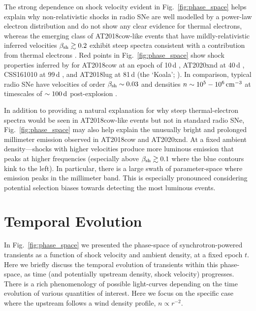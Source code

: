 \documentclass[twocolumn]{aastex63}
\begin{document}
The strong dependence on shock velocity evident in Fig.~\ref{fig:phase_space} helps explain why non-relativistic shocks in radio SNe are well modelled by a power-law electron distribution and do not show any clear evidence for thermal electrons, whereas the emerging class of AT2018cow-like events that have mildly-relativistic inferred velocities $\beta_{\rm sh} \gtrsim 0.2$ exhibit steep spectra consistent with a contribution from thermal electrons \citep{Ho+21b}.
Red points in Fig.~\ref{fig:phase_space} show shock properties inferred by \cite{Ho+21b} for AT2018cow at an epoch of 10\,d \citep{Margutti+19,Ho+19}, AT2020xnd at 40\,d \citep{Ho+21b}, CSS161010 at 99\,d \citep{Coppejans+20}, and AT2018lug at 81\,d (the `Koala'; \citealt{Ho+20}). In comparison, typical radio SNe have velocities of order $\beta_{\rm sh} \sim 0.03$ and densities $n \sim 10^5-10^6 \, {\rm cm}^{-3}$ at timescales of $\sim 100\,{\rm d}$ post-explosion \citep{Weiler+02}.

In addition to providing a natural explanation for why steep thermal-electron spectra would be seen in AT2018cow-like events but not in standard radio SNe, Fig.~\ref{fig:phase_space} may also help explain the unusually bright and prolonged millimeter emission observed in AT2018cow and AT2020xnd. At a fixed ambient density---shocks with higher velocities produce more luminous emission that peaks at higher frequencies (especially above $\beta_{\rm sh} \gtrsim 0.1$ where the blue contours kink to the left). In particular, there is a large swath of parameter-space where emission peaks in the millimeter band. This is especially pronounced considering potential selection biases towards detecting the most luminous events.


\section{Temporal Evolution}
\label{sec:time_evolution}

In Fig.~\ref{fig:phase_space} we presented the phase-space of synchrotron-powered transients as a function of shock velocity and ambient density, at a fixed epoch $t$. Here we briefly discuss the temporal evolution of transients within this phase-space, as time (and potentially upstream density, shock velocity) progresses. There is a rich phenomenology of possible light-curves depending on the time evolution of various quantities of interest. 
Here we focus on the specific case where the upstream follows a wind density profile, $n \propto r^{-2}$. 
\end{document}
